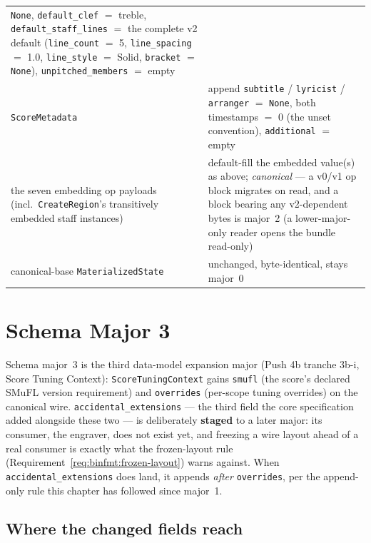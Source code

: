 \documentclass[11pt,letterpaper]{report}
\newcommand{\tablenums}[1]{{\addfontfeatures{Numbers={Lining,Tabular}}#1}}
\newcommand{\sectionsc}[1]{{\addfontfeatures{Letters=SmallCaps}#1}}
\newcounter{requirement}[chapter]
\begin{document}
\begin{center}
\begin{tabular}{p{1.9in} p{3.4in}}
    \texttt{None}, \texttt{default\_clef} $=$ treble,
    \texttt{default\_staff\_lines} $=$ the complete v2 default
    (\texttt{line\_count} $=$ 5, \texttt{line\_spacing} $=$ 1.0,
    \texttt{line\_style} $=$ Solid, \texttt{bracket} $=$ \texttt{None}),
    \texttt{unpitched\_members} $=$ empty \\
  \texttt{ScoreMetadata} & append \texttt{subtitle} / \texttt{lyricist}
    / \texttt{arranger} $=$ \texttt{None}, both timestamps $=$
    \tablenums{0} (the unset convention), \texttt{additional} $=$
    empty \\
  the seven embedding op payloads (incl.\ \texttt{CreateRegion}'s
    transitively embedded staff instances) & default-fill the embedded
    value(s) as above; \emph{canonical} --- a v0/v1 op block migrates on
    read, and a block bearing any v2-dependent bytes is major~2 (a
    lower-major-only reader opens the bundle read-only) \\
  canonical-base \texttt{MaterializedState} & unchanged, byte-identical,
    stays major~0 \\
  \bottomrule
\end{tabular}
\end{center}

\section{Schema Major 3}
\label{sec:evolution:major3}

Schema major~3 is the third data-model expansion major (Push 4b tranche
3b-i, \sectionsc{Score Tuning Context}): \texttt{ScoreTuningContext} gains
\texttt{smufl} (the score's declared SMuFL version requirement) and
\texttt{overrides} (per-scope tuning overrides) on the canonical wire.
\texttt{accidental\_extensions} --- the third field the core specification
added alongside these two --- is deliberately \textbf{staged} to a later
major: its consumer, the engraver, does not exist yet, and freezing a wire
layout ahead of a real consumer is exactly what the frozen-layout rule
(Requirement~\ref{req:binfmt:frozen-layout}) warns against. When
\texttt{accidental\_extensions} does land, it appends \emph{after}
\texttt{overrides}, per the append-only rule this chapter has followed since
major~1.

\subsection{Where the changed fields reach}
\end{document}
